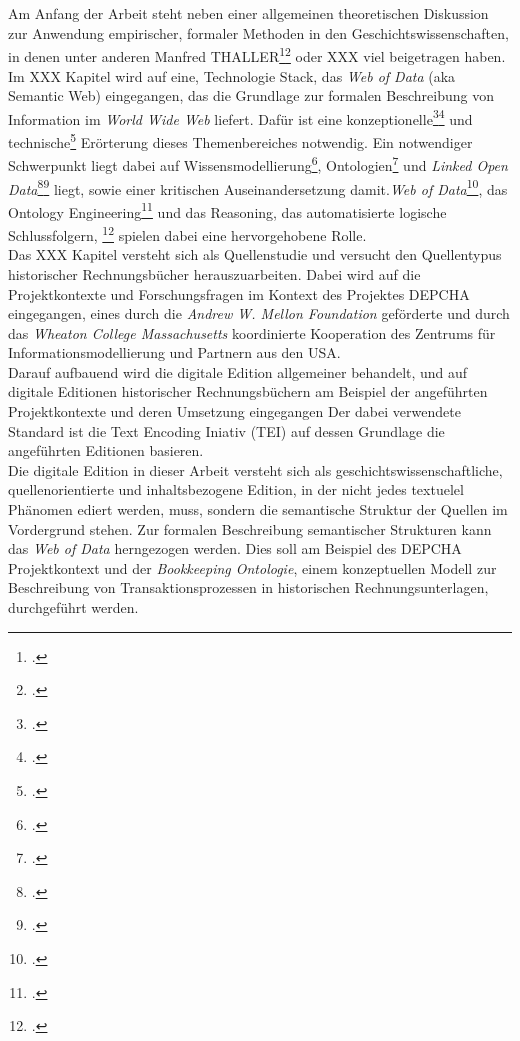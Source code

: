 \documentclass[12pt,a4paper]{article}
\begin{document}
\\
\\
Am Anfang der Arbeit steht neben einer allgemeinen theoretischen Diskussion zur Anwendung empirischer, formaler Methoden in den Geschichtswissenschaften, in denen unter anderen Manfred THALLER\footcite{thaller2017digital}\footcite{thaller2017ungefahre} oder XXX viel beigetragen haben.
\\
Im XXX Kapitel wird auf eine, Technologie Stack, das \textit{Web of Data} (aka Semantic Web) eingegangen, das die Grundlage zur formalen Beschreibung von Information im \textit{World Wide Web} liefert. Dafür ist eine konzeptionelle\footcite{berners2001semantic}\footcite{cardoso2007semantic} und technische\footcite{bernstein2016new} Erörterung dieses Themenbereiches notwendig. Ein notwendiger Schwerpunkt liegt dabei auf Wissensmodellierung\footcite{kelly2016practical}, Ontologien\footcite{stuckenschmidt2009ontologien} und \textit{Linked Open Data}\footcite{rietveld2015linked}\footcite{bauer2011linked} liegt, sowie einer kritischen Auseinandersetzung damit.\textit{Web of Data}\footcite{swartz2013aaron}, das Ontology Engineering\footcite{hitzler2016ontology} und das Reasoning, das automatisierte logische Schlussfolgern, \footcite{bursztyn2015reasoning} spielen dabei eine hervorgehobene Rolle.
\\
Das XXX Kapitel versteht sich als Quellenstudie und versucht den Quellentypus historischer Rechnungsbücher herauszuarbeiten. Dabei wird auf die Projektkontexte und Forschungsfragen im Kontext des Projektes DEPCHA eingegangen, eines durch die \textit{Andrew W. Mellon Foundation} geförderte und durch das \textit{Wheaton College Massachusetts} koordinierte Kooperation des Zentrums für Informationsmodellierung und Partnern aus den USA. 
\\
Darauf aufbauend wird die digitale Edition allgemeiner behandelt, und auf digitale Editionen historischer Rechnungsbüchern am Beispiel der angeführten Projektkontexte und deren Umsetzung eingegangen Der dabei verwendete Standard ist die Text Encoding Iniativ (TEI) auf dessen Grundlage die angeführten Editionen basieren. 
\\
Die digitale Edition in dieser Arbeit versteht sich als geschichtswissenschaftliche, quellenorientierte und inhaltsbezogene Edition, in der nicht jedes textuelel Phänomen ediert werden, muss, sondern die semantische Struktur der Quellen im Vordergrund stehen. Zur formalen Beschreibung semantischer Strukturen kann das \textit{Web of Data} herngezogen werden. Dies soll am Beispiel des DEPCHA Projektkontext und der \textit{Bookkeeping Ontologie}, einem konzeptuellen Modell zur Beschreibung von Transaktionsprozessen in historischen Rechnungsunterlagen, durchgeführt werden.
\end{document}
